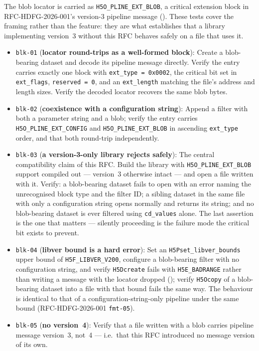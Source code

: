 \documentclass[../RFC-HDFG-2026-003.tex]{subfiles}
\begin{document}
The blob locator is carried as \texttt{H5O\_PLINE\_EXT\_BLOB}, a critical
extension block in RFC-HDFG-2026-001's version-3 pipeline message
().  These tests cover the framing rather than
the feature: they are what establishes that a library implementing
version~3 without this RFC behaves safely on a file that uses it.

\begin{itemize}
\item \texttt{blk-01} (\textbf{locator round-trips as a well-formed
  block}): Create a blob-bearing dataset and decode its pipeline message
  directly.  Verify the entry carries exactly one block with
  \texttt{ext\_type = 0x0002}, the critical bit set in
  \texttt{ext\_flags}, \texttt{reserved = 0}, and an \texttt{ext\_length}
  matching the file's address and length sizes.  Verify the decoded
  locator recovers the same blob bytes.
\item \texttt{blk-02} (\textbf{coexistence with a configuration string}):
  Append a filter with both a parameter string and a blob; verify the
  entry carries \texttt{H5O\_PLINE\_EXT\_CONFIG} and
  \texttt{H5O\_PLINE\_EXT\_BLOB} in ascending \texttt{ext\_type} order,
  and that both round-trip independently.
\item \texttt{blk-03} (\textbf{a version-3-only library rejects safely}):
  The central compatibility claim of this RFC.  Build the library with
  \texttt{H5O\_PLINE\_EXT\_BLOB} support compiled out --- version~3
  otherwise intact --- and open a file written with it.  Verify: a
  blob-bearing dataset fails to open with an error naming the
  unrecognised block type and the filter ID; a sibling dataset in the
  same file with only a configuration string opens normally and returns
  its string; and no blob-bearing dataset is ever filtered using
  \texttt{cd\_values} alone.  The last assertion is the one that matters
  --- silently proceeding is the failure mode the critical bit exists to
  prevent.
\item \texttt{blk-04} (\textbf{libver bound is a hard error}): Set an
  \texttt{H5Pset\_libver\_bounds} upper bound of
  \texttt{H5F\_LIBVER\_V200}, configure a blob-bearing filter with no
  configuration string, and verify \texttt{H5Dcreate} fails with
  \texttt{H5E\_BADRANGE} rather than writing a message with the locator
  dropped (); verify \texttt{H5Ocopy} of a
  blob-bearing dataset into a file with that bound fails the same way.
  The behaviour is identical to that of a configuration-string-only
  pipeline under the same bound (RFC-HDFG-2026-001 \texttt{fmt-05}).
\item \texttt{blk-05} (\textbf{no version~4}): Verify that a file written
  with a blob carries pipeline message version~3, not~4 --- i.e.\ that
  this RFC introduced no message version of its own.
\end{itemize}
\end{document}
